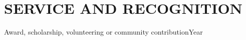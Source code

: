 \section{SERVICE AND RECOGNITION}
Award, scholarship, volunteering or community contribution\hfill{\small Year}
